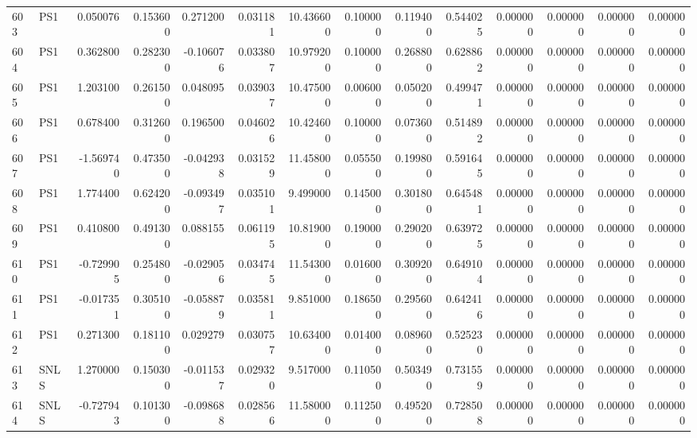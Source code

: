 \begin{tabular}{llrrrrrrrrrrrr}
603 &    PS1 &  0.050076 &      0.153600 &  0.271200 &    0.031181 &  10.436600 &      0.100000 &   0.119400 &  0.544025 &  0.000000 &   0.000000 &     0.000000 &     0.000000 \\
604 &    PS1 &  0.362800 &      0.282300 & -0.106076 &    0.033807 &  10.979200 &      0.100000 &   0.268800 &  0.628862 &  0.000000 &   0.000000 &     0.000000 &     0.000000 \\
605 &    PS1 &  1.203100 &      0.261500 &  0.048095 &    0.039037 &  10.475000 &      0.006000 &   0.050200 &  0.499471 &  0.000000 &   0.000000 &     0.000000 &     0.000000 \\
606 &    PS1 &  0.678400 &      0.312600 &  0.196500 &    0.046026 &  10.424600 &      0.100000 &   0.073600 &  0.514892 &  0.000000 &   0.000000 &     0.000000 &     0.000000 \\
607 &    PS1 & -1.569740 &      0.473500 & -0.042938 &    0.031529 &  11.458000 &      0.055500 &   0.199800 &  0.591645 &  0.000000 &   0.000000 &     0.000000 &     0.000000 \\
608 &    PS1 &  1.774400 &      0.624200 & -0.093497 &    0.035101 &   9.499000 &      0.145000 &   0.301800 &  0.645481 &  0.000000 &   0.000000 &     0.000000 &     0.000000 \\
609 &    PS1 &  0.410800 &      0.491300 &  0.088155 &    0.061195 &  10.819000 &      0.190000 &   0.290200 &  0.639725 &  0.000000 &   0.000000 &     0.000000 &     0.000000 \\
610 &    PS1 & -0.729905 &      0.254800 & -0.029056 &    0.034745 &  11.543000 &      0.016000 &   0.309200 &  0.649104 &  0.000000 &   0.000000 &     0.000000 &     0.000000 \\
611 &    PS1 & -0.017351 &      0.305100 & -0.058879 &    0.035811 &   9.851000 &      0.186500 &   0.295600 &  0.642416 &  0.000000 &   0.000000 &     0.000000 &     0.000000 \\
612 &    PS1 &  0.271300 &      0.181100 &  0.029279 &    0.030757 &  10.634000 &      0.014000 &   0.089600 &  0.525230 &  0.000000 &   0.000000 &     0.000000 &     0.000000 \\
613 &   SNLS &  1.270000 &      0.150300 & -0.011537 &    0.029320 &   9.517000 &      0.110500 &   0.503490 &  0.731559 &  0.000000 &   0.000000 &     0.000000 &     0.000000 \\
614 &   SNLS & -0.727943 &      0.101300 & -0.098688 &    0.028566 &  11.580000 &      0.112500 &   0.495200 &  0.728508 &  0.000000 &   0.000000 &     0.000000 &     0.000000 \\

\end{tabular}
